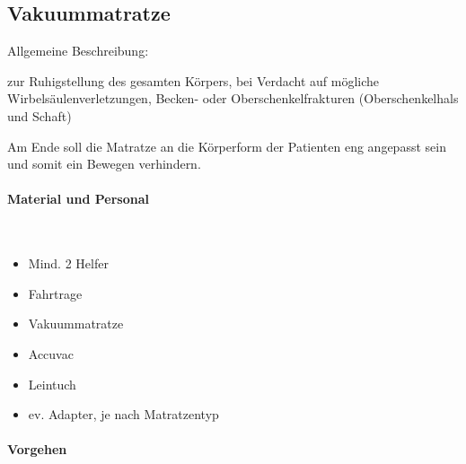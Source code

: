 \subsection{Vakuummatratze}
\label{topic:vakuummatratze-handhabung}

Allgemeine
Beschreibung: 

zur Ruhigstellung des gesamten Körpers, bei Verdacht auf mögliche
Wirbelsäulenverletzungen, Becken- oder Oberschenkelfrakturen
(Oberschenkelhals und Schaft)

Am Ende soll die Matratze an die Körperform der Patienten eng
angepasst sein und somit ein Bewegen verhindern.

\paragraph*{Material und Personal}~

\begin{itemize}
    \item Mind. 2 Helfer
    \item Fahrtrage
    \item Vakuummatratze
    \item Accuvac
    \item Leintuch
    \item ev. Adapter, je nach Matratzentyp
\end{itemize}


\paragraph*{Vorgehen}~

